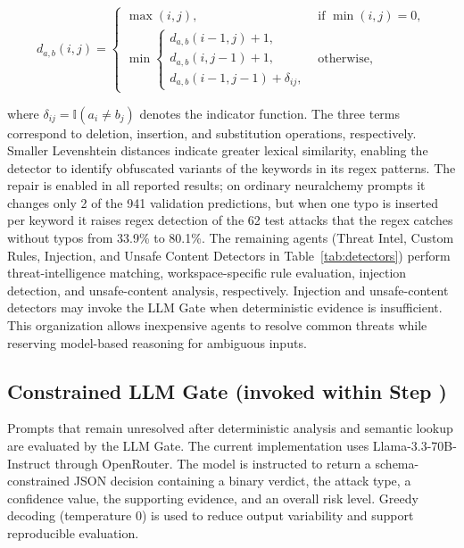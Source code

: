 \documentclass[runningheads]{llncs}
\newif\ifrev
\newcommand{\rev}[1]{\ifrev\hl{#1}\else#1\fi}                  %
\newcommand{\revm}[1]{\ifrev\colorbox{yellow}{$#1$}\else#1\fi} %
\begin{document}
\begin{equation}
d_{a,b}(i,j)=
\begin{cases}
\max(i,j), & \revm{\text{if } \min(i,j)=0},\\
\min
\begin{cases}
d_{a,b}(i-1,j)+1,\\
d_{a,b}(i,j-1)+1,\\
d_{a,b}(i-1,j-1)+\delta_{ij},
\end{cases}
& \text{otherwise},
\end{cases}
\label{eq:levenshtein}
\end{equation}

where $\delta_{ij}=\mathbb{I}(a_i\neq b_j)$ denotes the indicator function. The three terms correspond to deletion, insertion, and substitution operations, respectively. Smaller Levenshtein distances indicate greater lexical similarity, enabling the detector to identify obfuscated variants of \rev{the keywords in its regex patterns. The repair is enabled in all reported results; on ordinary neuralchemy prompts it changes only 2 of the 941 validation predictions, but when one typo is inserted per keyword it raises regex detection of the 62 test attacks that the regex catches without typos from 33.9\% to 80.1\%.} The remaining agents (Threat Intel, Custom Rules, Injection, and Unsafe Content Detectors in Table~\ref{tab:detectors}) perform threat-intelligence matching, workspace-specific rule evaluation, injection detection, and unsafe-content analysis, respectively. Injection and unsafe-content detectors may invoke the LLM Gate when deterministic evidence is insufficient. This organization allows inexpensive agents to resolve common threats while reserving model-based reasoning for ambiguous inputs.

\subsection{Constrained LLM Gate (invoked within Step )}\label{sec:llm_gate}

Prompts that remain unresolved after deterministic analysis and semantic lookup are evaluated by the LLM Gate. The current implementation uses Llama-3.3-70B-Instruct through \rev{OpenRouter}. The model is instructed to return a schema-constrained \rev{JSON} decision containing \rev{a binary verdict, the attack type, a confidence value, the supporting evidence, and an overall risk level}. Greedy decoding \rev{(temperature 0)} is used to reduce output variability and support reproducible evaluation.
\end{document}
